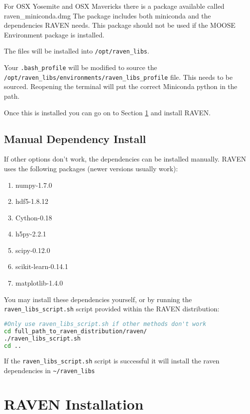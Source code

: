 For OSX Yosemite and OSX Mavericks there is a package available called
raven\_miniconda.dmg The package includes both miniconda and the
dependencies RAVEN needs.  This package should not be used if the
MOOSE Environment package is installed.

The files will be installed into \texttt{/opt/raven\_libs}.

Your \texttt{.bash\_profile} will be modified to source
the\\ \texttt{/opt/raven\_libs/environments/raven\_libs\_profile}
file.  This needs to be sourced.  Reopening the terminal will put the
correct Miniconda python in the path.

Once this is installed you can go on to Section \ref{raven_installation} and install RAVEN.

\subsection{Manual Dependency Install}

If other options don't work, the dependencies can be installed
manually.  RAVEN uses the following packages (newer versions usually
work):

\begin{enumerate}
\item numpy-1.7.0
\item hdf5-1.8.12
\item Cython-0.18
\item h5py-2.2.1
\item scipy-0.12.0
\item scikit-learn-0.14.1
\item matplotlib-1.4.0
\end{enumerate}

You may install these dependencies yourself, or by running the
\texttt{raven\_libs\_script.sh} script provided within the RAVEN distribution:

\begin{lstlisting}[language=bash]
#Only use raven_libs_script.sh if other methods don't work
cd full_path_to_raven_distribution/raven/
./raven_libs_script.sh
cd ..
\end{lstlisting}

If the \texttt{raven\_libs\_script.sh} script is successful it will
install the raven dependencies in \verb'~/raven_libs'

\goToRavenInstallation

\section{RAVEN Installation}
\label{raven_installation}

